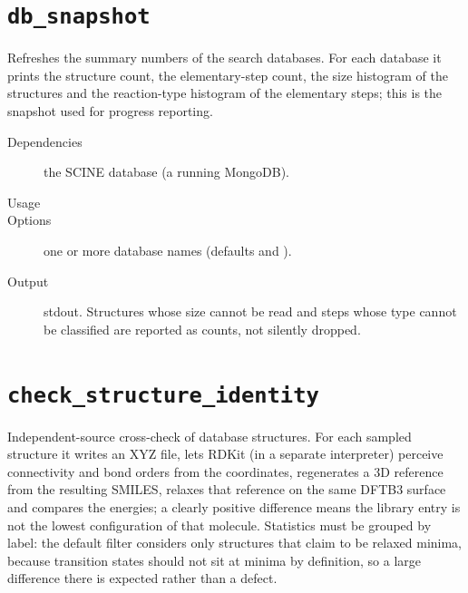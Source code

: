 \section{\texttt{db\_snapshot}}

Refreshes the summary numbers of the search databases.  For each database it
prints the structure count, the elementary-step count, the size histogram of
the structures and the reaction-type histogram of the elementary steps; this
is the snapshot used for progress reporting.

\begin{description}
  \item[Dependencies] the SCINE database (a running MongoDB).
  \item[Usage] 
  \item[Options]  one or more database names (defaults
         and ).
  \item[Output] stdout.  Structures whose size cannot be read and steps
        whose type cannot be classified are reported as counts, not silently
        dropped.
\end{description}

\section{\texttt{check\_structure\_identity}}

Independent-source cross-check of database structures.  For each sampled
structure it writes an XYZ file, lets RDKit (in a separate interpreter)
perceive connectivity and bond orders from the coordinates, regenerates a 3D
reference from the resulting SMILES, relaxes that reference on the same DFTB3
surface and compares the energies; a clearly positive difference means the
library entry is not the lowest configuration of that molecule.  Statistics
must be grouped by label: the default filter considers only structures that
claim to be relaxed minima, because transition states should not sit at
minima by definition, so a large difference there is expected rather than a
defect.

